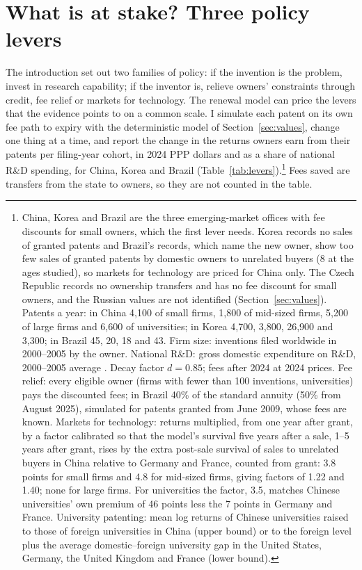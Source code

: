 \section{What is at stake? Three policy levers}\label{sec:stake}

The introduction set out two families of policy: if the invention is the problem, invest in research capability; if
the inventor is, relieve owners' constraints through credit, fee relief or markets for technology. The renewal model
can price the levers that the evidence points to on a common scale. I simulate each patent on its own fee path to
expiry with the deterministic model of Section~\ref{sec:values}, change one thing at a time, and report the change
in the returns owners earn from their patents per filing-year cohort, in 2024 PPP dollars and as a share of national
R\&D spending, for China, Korea and Brazil (Table~\ref{tab:levers}).\footnote{\label{fn:levers}China, Korea and Brazil are the three emerging-market
offices with fee discounts for small owners, which the first lever needs. Korea records no sales of granted patents
and Brazil's records, which name the new owner, show too few sales of granted patents by domestic owners to unrelated buyers (8 at the
ages studied), so markets for technology are priced for China only. The Czech
Republic records no ownership transfers and has no fee discount for small owners, and the Russian values are not
identified (Section~\ref{sec:values}). Patents a year: in China 4{,}100 of
small firms, 1{,}800 of mid-sized firms, 5{,}200 of large firms and 6{,}600 of universities; in Korea 4{,}700, 3{,}800,
26{,}900 and 3{,}300; in Brazil 45, 20, 18 and 43. Firm size: inventions filed worldwide in 2000--2005 by the owner. National R\&D: gross domestic expenditure on
R\&D, 2000--2005 average \citep{WDI}. Decay factor $d = 0.85$; fees after 2024 at 2024 prices. Fee relief: every eligible
owner (firms with fewer than 100 inventions, universities) pays the discounted fees; in Brazil 40\% of the
standard annuity (50\% from August 2025), simulated for patents granted from June 2009, whose fees are known. Markets for technology:
returns multiplied, from one year after grant, by a factor calibrated so that the model's survival five years after a
sale, 1--5 years after grant, rises by the extra post-sale survival of sales to unrelated buyers in China relative to
Germany and France, counted from grant: 3.8 points for small firms and 4.8 for mid-sized firms,
giving factors of 1.22 and 1.40; none for large firms. For universities the factor, 3.5, matches Chinese
universities' own premium of 46 points less the 7 points in Germany and France. University patenting: mean log returns of Chinese
universities raised to those of foreign universities in China (upper bound) or to the foreign level plus the average
domestic--foreign university gap in the United States, Germany, the United Kingdom and France (lower bound).} Fees saved are transfers from the state to owners,
so they are not counted in the table.

